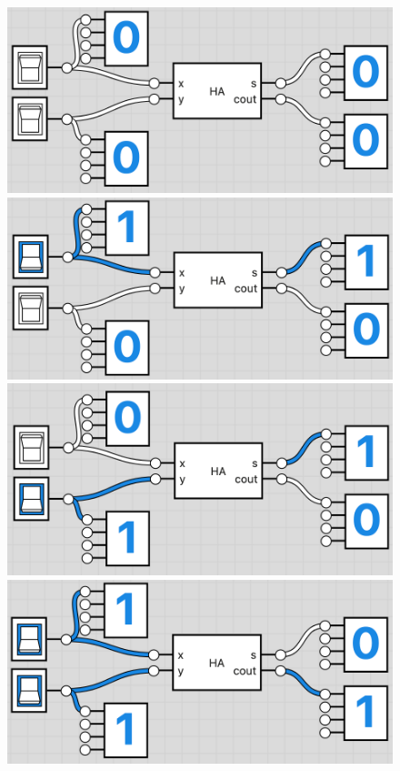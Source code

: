 \begin{figure}[H]
\centering
\begin{minipage}{0.45\textwidth}
\centering
\includegraphics[width=\textwidth]{ha_1}
\end{minipage}
\begin{minipage}{0.45\textwidth}
\centering
\includegraphics[width=\textwidth]{ha_2}
\end{minipage}
\begin{minipage}{0.45\textwidth}
\centering
\includegraphics[width=\textwidth]{ha_3}
\end{minipage}
\begin{minipage}{0.45\textwidth}
\centering
\includegraphics[width=\textwidth]{ha_4}

\end{minipage}
\end{figure}
